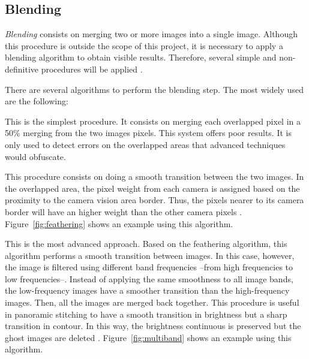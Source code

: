\subsection{Blending}
\emph{Blending} consists on merging two or more images into a single image. Although this procedure is outside the scope of this project, it is necessary to apply a blending algorithm to obtain visible results. Therefore, several simple and non-definitive procedures will be applied .

There are several algorithms to perform the blending step. The most widely used are the following:
\begin{description}[font=\normalfont\textsl]
\item[50\% blending.] This is the simplest procedure. It consists on merging each overlapped pixel in a 50\% merging from the two images pixels. This system offers poor results. It is only used to detect errors on the overlapped areas that advanced techniques would obfuscate.
\item[Feathering.] This procedure consists on doing a smooth transition between the two images. In the overlapped area, the pixel weight from each camera is assigned based on the proximity to the camera vision area border. Thus, the pixels nearer to its camera border will have an higher weight than the other camera pixels \cite{feathering}. Figure~\ref{fig:feathering} shows an example using this algorithm. 
\item[Multiband blending.] This is the most advanced approach. Based on the feathering algorithm, this algorithm performs a smooth transition between images. In this case, however, the image is filtered using different  band frequencies --from high frequencies to low frequencies--. Instead of applying the same smoothness to all image bands, the low-frequency images have a smoother transition than the high-frequency images. Then, all the images are merged back together. This procedure is useful in panoramic stitching to have a smooth transition in brightness but a sharp transition in contour. In this way, the brightness continuous is preserved but the ghost images are deleted \cite{multiband}. Figure~\ref{fig:multiband} shows an example using this algorithm. 
\end{description}
